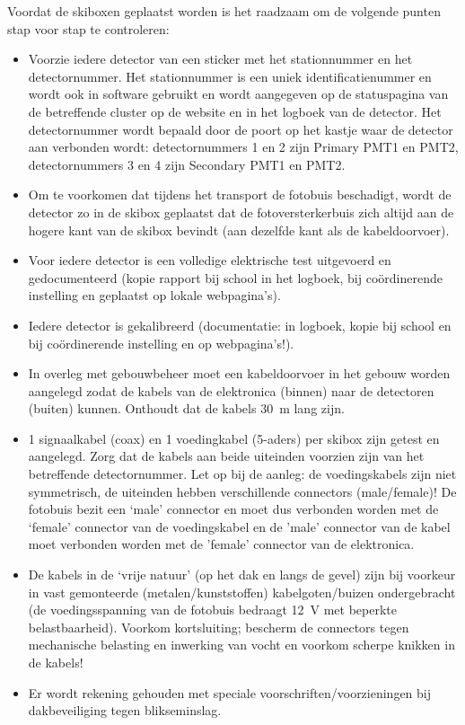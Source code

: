 Voordat de skiboxen geplaatst worden is het raadzaam om de volgende
punten stap voor stap te controleren:

\begin{itemize}
    \item Voorzie iedere detector van een sticker met het stationnummer
    en het detectornummer. Het stationnummer is een uniek
    identificatienummer en wordt ook in software gebruikt en wordt
    aangegeven op de statuspagina van de betreffende cluster op de
    \hisparc website en in het logboek van de detector. Het
    detectornummer wordt bepaald door de poort op het \hisparc kastje
    waar de detector aan verbonden wordt: detectornummers 1 en 2 zijn
    Primary PMT1 en PMT2, detectornummers 3 en 4 zijn Secondary PMT1 en PMT2.
    \item Om te voorkomen dat tijdens het transport de fotobuis
    beschadigt, wordt de detector zo in de skibox geplaatst dat de
    fotoversterkerbuis zich altijd aan de hogere kant van de skibox
    bevindt (aan dezelfde kant als de kabeldoorvoer).
    \item Voor iedere detector is een volledige elektrische test
    uitgevoerd en gedocumenteerd (kopie rapport bij school in het
    logboek, bij coördinerende instelling en geplaatst op lokale
    webpagina’s).
    \item Iedere detector is gekalibreerd (documentatie: in logboek,
    kopie bij school en bij coördinerende instelling en op
    webpagina’s!).
    \item In overleg met gebouwbeheer moet een kabeldoorvoer in het
    gebouw worden aangelegd zodat de kabels van de \hisparc elektronica
    (binnen) naar de detectoren (buiten) kunnen. Onthoudt dat de kabels
    \SI{30}{\meter} lang zijn.
    \item 1 signaalkabel (coax) en 1 voedingkabel (5-aders) per skibox
    zijn getest en aangelegd. Zorg dat de kabels aan beide uiteinden
    voorzien zijn van het betreffende detectornummer. Let op bij de
    aanleg: de voedingskabels zijn niet symmetrisch, de uiteinden hebben
    verschillende connectors (male/female)! De fotobuis bezit een ‘male’
    connector en moet dus verbonden worden met de ‘female’ connector van
    de voedingskabel en de 'male' connector van de kabel moet verbonden
    worden met de 'female' connector van de \hisparc elektronica. 
    \item De kabels in de ‘vrije natuur’ (op het dak en langs de gevel)
    zijn bij voorkeur in vast gemonteerde (metalen/kunststoffen)
    kabelgoten/buizen ondergebracht (de voedingsspanning van de fotobuis
    bedraagt \SI{12}{\volt} met beperkte belastbaarheid). Voorkom
    kortsluiting; bescherm de connectors tegen mechanische belasting en
    inwerking van vocht en voorkom scherpe knikken in de kabels!
    \item Er wordt rekening gehouden met speciale
    voorschriften/voorzieningen bij dakbeveiliging tegen blikseminslag.
\end{itemize}


